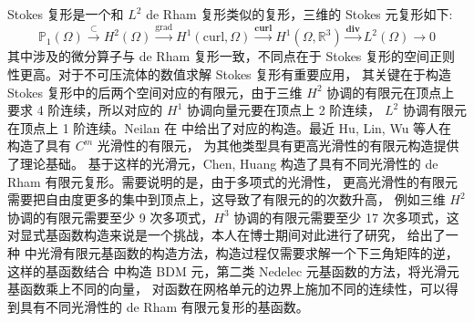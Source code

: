 \documentclass[lang=cn,a4paper,newtx]{elegantpaper}
\begin{document}
Stokes 复形是一个和 $L^2$ de Rham 复形类似的复形，三维的 Stokes 元复形如下:
$$
\mathbb{P}_1(\Omega) \xrightarrow{\subset} H^2(\Omega) \xrightarrow{\mathrm{grad}} 
H^1(\text{curl}, \Omega)
\xrightarrow{\mathbf{curl}} H^1(\Omega, \mathbb{R}^3) \xrightarrow{\mathbf{div}}
L^2(\Omega) \rightarrow 0
$$
其中涉及的微分算子与 de Rham 复形一致，不同点在于 Stokes
复形的空间正则性更高。对于不可压流体的数值求解 Stokes 复形有重要应用，
其关键在于构造 Stokes 复形中的后两个空间对应的有限元，由于三维 $H^2$ 
协调的有限元在顶点上要求 4 阶连续，所以对应的 $H^1$ 协调向量元要在顶点上 2 阶连续，
$L^2$ 协调有限元在顶点上 1 阶连续。Neilan 在 \cite{neilan2015discrete} 
中给出了对应的构造。最近 Hu, Lin, Wu 等人在\cite{hu2023construction} 
构造了具有 $C^m$ 光滑性的有限元，
为其他类型具有更高光滑性的有限元构造提供了理论基础。
基于这样的光滑元，Chen, Huang\cite{chenhuangstokes2024} 构造了具有不同光滑性的 
de Rham 有限元复形。需要说明的是，由于多项式的光滑性，
更高光滑性的有限元需要把自由度更多的集中到顶点上，这导致了有限元的的次数升高，
例如三维 $H^2$ 协调的有限元需要至少 9 次多项式，$H^3$ 协调的有限元需要至少 17 
次多项式，这对显式基函数构造来说是一个挑战，本人在博士期间对此进行了研究，
给出了一种\cite{hu2023construction}
中光滑有限元基函数的构造方法，构造过程仅需要求解一个下三角矩阵的逆，
这样的基函数结合\cite{Chen2024GeometricDA} 中构造 BDM 元，第二类 Nedelec 
元基函数的方法，将光滑元基函数乘上不同的向量，
对函数在网格单元的边界上施加不同的连续性，可以得到具有不同光滑性的 de Rham 
有限元复形的基函数。
\end{document}
